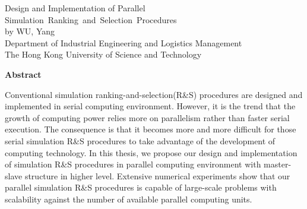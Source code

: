 \begin{center}
{\Large Design and Implementation of Parallel Simulation~Ranking~and~Selection~Procedures}\\
\vspace{10mm}
by WU, Yang\\
\vspace{15mm}
Department of Industrial Engineering and Logistics Management\\
\vspace{10mm}
The Hong Kong University of Science and Technology
\end{center}
\vspace{12mm}
\begin{center}
\textbf{Abstract}
\end{center}
\par
\noindent

Conventional simulation ranking-and-selection(R\&S) procedures are designed and implemented in serial computing environment. However, it is the trend that the growth of computing power relies more on parallelism rather than faster serial execution. The consequence is that it becomes more and more difficult for those serial simulation R\&S procedures to take advantage of the development of computing technology. In this thesis, we propose our design and implementation of simulation R\&S procedures in parallel computing environment with master-slave structure in higher level. Extensive numerical experiments show that our parallel simulation R\&S procedures is capable of large-scale problems with scalability against the number of available parallel computing units.

